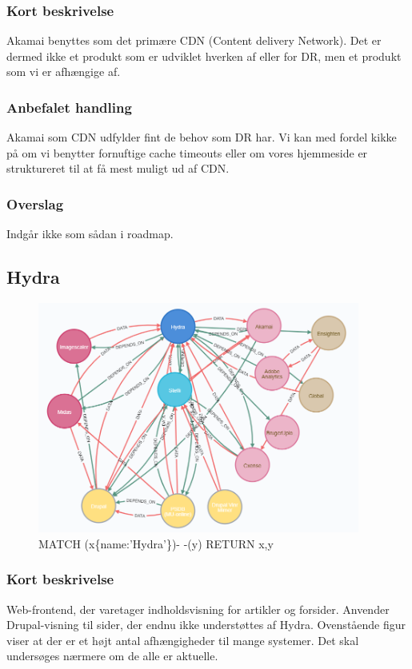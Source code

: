 \documentclass{article}
\begin{document}
\subsubsection{Kort beskrivelse}
Akamai benyttes som det primære CDN (Content delivery Network). 
Det er dermed ikke et produkt som er udviklet hverken af eller for DR, 
men et produkt som vi er afhængige af. 
\subsubsection{Anbefalet handling}
Akamai som CDN udfylder fint de behov som DR har. 
Vi kan med fordel kikke på om vi benytter fornuftige cache timeouts eller om vores hjemmeside er struktureret til at få mest muligt ud af CDN.

\subsubsection{Overslag}
Indgår ikke som sådan i roadmap.


\subsection{Hydra}
\begin{figure}[h]
\includegraphics[width=300pt]{Hydra.PNG}
\caption{MATCH (x\{name:'Hydra'\})- -(y) RETURN x,y}
\end{figure}
\subsubsection{Kort beskrivelse}
Web-frontend, der varetager indholdsvisning for artikler og forsider. Anvender Drupal-visning til sider, der endnu ikke understøttes af Hydra.
Ovenstående figur viser at der er et højt antal afhængigheder til mange systemer. Det skal undersøges nærmere om de alle er aktuelle.
\end{document}
